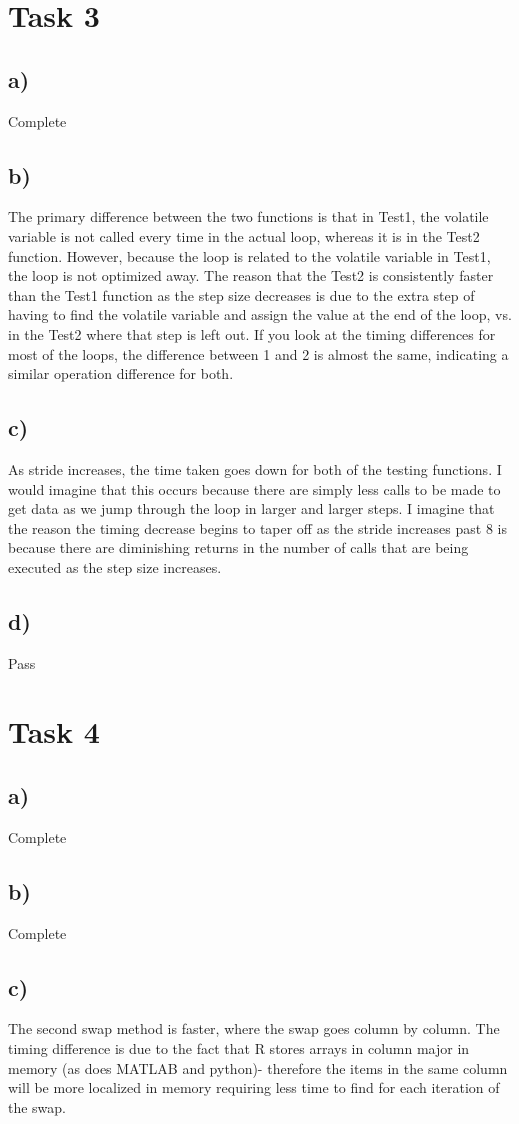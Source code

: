 \documentclass[11pt, oneside]{article}   	%
\begin{document}
\section*{Task 3}
\subsection*{a)}
Complete
\subsection*{b)}
The primary difference between the two functions is that in Test1, the volatile variable is not called every time in the actual loop, whereas it is in the Test2 function.  However, because the loop is related to the volatile variable in Test1, the loop is not optimized away.  The reason that the Test2 is consistently faster than the Test1 function as the step size decreases is due to the extra step of having to find the volatile variable and assign the value at the end of the loop, vs. in the Test2 where that step is left out.  If you look at the timing differences for most of the loops, the difference between 1 and 2 is almost the same, indicating a similar operation difference for both.
\subsection*{c)}
As stride increases, the time taken goes down for both of the testing functions.  I would imagine that this occurs because there are simply less calls to be made to get data as we jump through the loop in larger and larger steps.  I imagine that the reason the timing decrease begins to taper off as the stride increases past 8 is because there are diminishing returns in the number of calls that are being executed as the step size increases.  
\subsection*{d)}
Pass

\section*{Task 4}
\subsection*{a)}
Complete
\subsection*{b)}
Complete
\subsection*{c)}
The second swap method is faster, where the swap goes column by column.  The timing difference is due to the fact that R stores arrays in column major in memory (as does MATLAB and python)- therefore the items in the same column will be more localized in memory requiring less time to find for each iteration of the swap.
\end{document}
